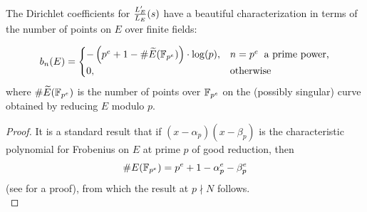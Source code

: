 The Dirichlet coefficients for $\frac{L_E^{\prime}}{L_E}(s)$ have a beautiful characterization in terms of the number of points on $E$ over finite fields:
\begin{proposition}
\begin{equation}
b_n(E) = \begin{cases}
-\left(p^e + 1 - \#\widetilde{E}(\mathbb{F}_{p^e})\right)\cdot \log(p), & n=p^e\;\;\text{a prime power,} \\
0, & \text{otherwise} \end{cases}
\end{equation}
where $\#\widetilde{E}(\mathbb{F}_{p^e})$ is the number of points over $\mathbb{F}_{p^e}$ on the (possibly singular) curve obtained by reducing $E$ modulo $p$.
\end{proposition}

\begin{proof}
It is a standard result that if $(x-\alpha_p)(x-\beta_p)$ is the characteristic polynomial for Frobenius on $E$ at prime $p$ of good reduction, then
\begin{equation}
\#E(\mathbb{F}_{p^e}) = p^e + 1 - \alpha_p^e - \beta_p^e
\end{equation}
(see \cite[pp. 134-136]{Sil-1985} for a proof), from which the result at $p \nmid N$ follows. \\


\end{proof}
